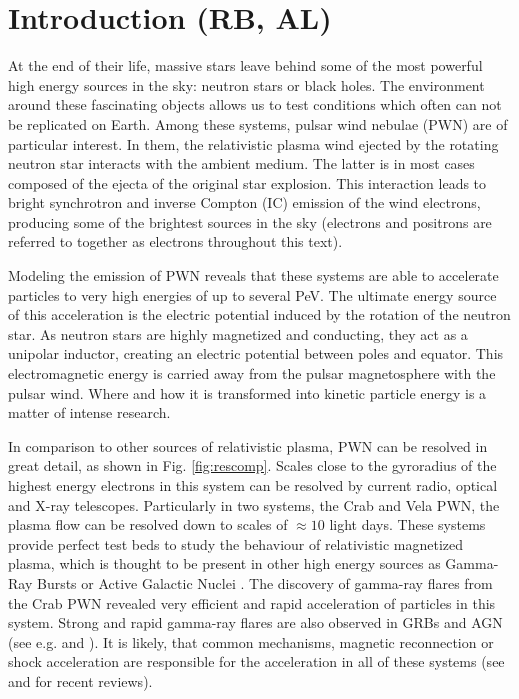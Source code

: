 \section{Introduction (RB, AL)}
At the end of their life, massive stars leave behind some of the most powerful high energy sources in the sky: neutron stars or black holes. The environment around these fascinating objects allows
us to test conditions which often can not be replicated on Earth. Among these systems, pulsar wind nebulae (PWN) are of particular interest. In them, the relativistic plasma wind ejected by the rotating neutron star interacts with the ambient medium. The latter is in most cases composed of the ejecta of the original star explosion. This interaction leads to bright synchrotron and inverse Compton (IC) emission of the wind electrons, producing some of the brightest sources in the sky (electrons and positrons are referred to together as electrons throughout this text).

Modeling the emission of PWN reveals that these systems are able to accelerate particles to very high energies of up to several PeV. The ultimate energy source of this acceleration is the electric potential induced by the rotation of the neutron star. As neutron stars are highly magnetized and conducting, they act as a unipolar inductor, creating an electric potential between poles and equator. This electromagnetic energy is carried away from the pulsar magnetosphere with the pulsar wind. Where and how it is transformed into kinetic particle energy is a matter of intense research.

In comparison to other sources of relativistic plasma, PWN can be resolved in great detail, as shown in Fig. \ref{fig:rescomp}. Scales close to the gyroradius of the highest energy electrons in this system can be resolved by current radio, optical and X-ray telescopes. Particularly in two systems, the Crab and Vela PWN, the plasma flow can be resolved down to scales of $\approx 10$ light days. These systems provide perfect test beds to study the behaviour of relativistic magnetized plasma, which is thought to be present in other high energy sources as Gamma-Ray Bursts or Active Galactic Nuclei \citep{Berger_2014,Massaro_2015}. The discovery of gamma-ray flares from the Crab PWN revealed very efficient and rapid acceleration of particles in this system. Strong and rapid gamma-ray flares are also observed in GRBs and AGN (see e.g. \citep{Ackermann_2013} and \citep{Aharonian_2009}). It is likely, that common mechanisms, magnetic reconnection or shock acceleration are responsible for the acceleration in all of these systems (see \citep{Kagan_2015} and \citep{Sironi_2015} for recent reviews).

